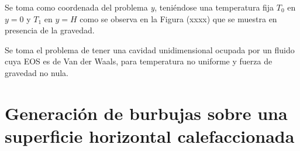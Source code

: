 Se toma como coordenada del problema \textit{y}, teniéndose una temperatura fija $T_{0}$ en $y = 0$ y $T_{1}$ en $y = H$ como se observa en la Figura (xxxx) que se muestra en presencia de la gravedad.





Se toma el problema de tener una cavidad unidimensional ocupada por un fluido cuya EOS es de Van der Waals, para temperatura no uniforme y fuerza de gravedad no nula.



\section{Generación de burbujas sobre una superficie horizontal calefaccionada}

